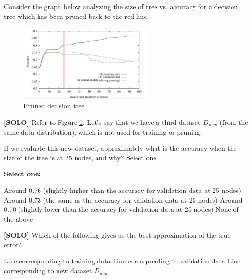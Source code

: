 \documentclass[11pt,addpoints,answers]{exam}
\begin{document}
\begin{questions}
\begin{parts}
    
    \end{parts}
    
    \clearpage
    Consider the graph below analyzing the size of tree vs. accuracy for a decision tree which has been pruned back to the red line. 
 

\begin{figure}[H]
  \centering
  \includegraphics[width = 0.6\textwidth]{images/dtree.png}
  \caption{Pruned decision tree \label{fig:dtree}}
\end{figure}
      

   \question[1] \textbf{[SOLO]} Refer to Figure \ref{fig:dtree}. Let's say that we have a third dataset $D_{new}$ (from the same data distribution), which is not used for training or pruning. 
    
    If we evaluate this new dataset, approximately what is the accuracy when the size of the tree is at 25 nodes, and why? Select one. 
    
    
    \textbf{Select one:}
    \begin{checkboxes}
        \choice Around 0.76 (slightly higher than the accuracy for validation data at 25 nodes)
        \choice Around 0.73 (the same as the accuracy for validation data at 25 nodes)
        \choice Around 0.70 (slightly lower than the accuracy for  validation data at 25 nodes)
        \choice None of the above
    \end{checkboxes}
    
    
    
    
      \question[1] \textbf{[SOLO]} Which of the following gives us the best approximation of the true error? 
   
    
    
 \begin{checkboxes}
        \choice Line corresponding to training data 
        \choice Line corresponding to validation data 
        \choice Line corresponding to new dataset $D_{new}$ 
    \end{checkboxes}
    
    
  

\end{questions}
\end{document}
